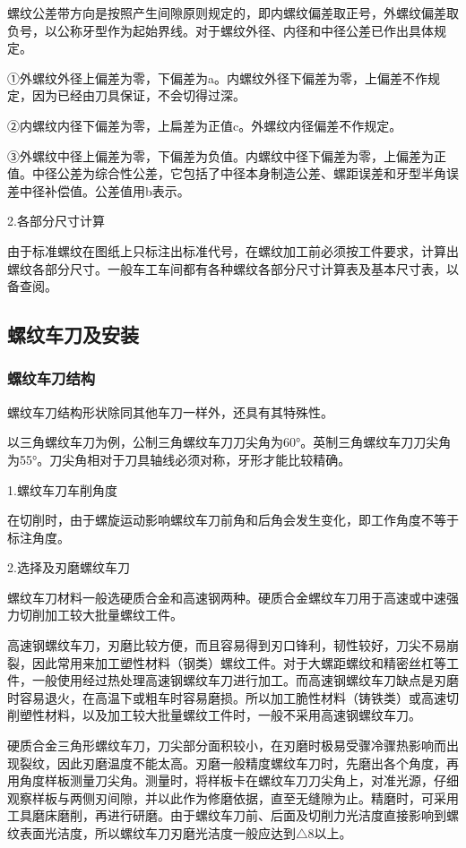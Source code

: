 \documentclass{ctexbook}
\begin{document}
螺纹公差带方向是按照产生间隙原则规定的，即内螺纹偏差取正号，外螺纹偏差取负号，以公称牙型作为起始界线。对于螺纹外径、内径和中径公差已作出具体规定。

①外螺纹外径上偏差为零，下偏差为a。内螺纹外径下偏差为零，上偏差不作规定，因为已经由刀具保证，不会切得过深。

②内螺纹内径下偏差为零，上扁差为正值c。外螺纹内径偏差不作规定。

③外螺纹中径上偏差为零，下偏差为负值。内螺纹中径下偏差为零，上偏差为正值。中径公差为综合性公差，它包括了中径本身制造公差、螺距误差和牙型半角误差中径补偿值。公差值用b表示。

2.各部分尺寸计算

由于标准螺纹在图纸上只标注出标准代号，在螺纹加工前必须按工件要求，计算出螺纹各部分尺寸。一般车工车间都有各种螺纹各部分尺寸计算表及基本尺寸表，以备查阅。
\subsection{螺纹车刀及安装}
\subsubsection{螺纹车刀结构}
螺纹车刀结构形状除同其他车刀一样外，还具有其特殊性。

以三角螺纹车刀为例，公制三角螺纹车刀刀尖角为60°。英制三角螺纹车刀刀尖角为55°。刀尖角相对于刀具轴线必须对称，牙形才能比较精确。

1.螺纹车刀车削角度

在切削时，由于螺旋运动影响螺纹车刀前角和后角会发生变化，即工作角度不等于标注角度。

2.选择及刃磨螺纹车刀

螺纹车刀材料一般选硬质合金和高速钢两种。硬质合金螺纹车刀用于高速或中速强力切削加工较大批量螺纹工件。

高速钢螺纹车刀，刃磨比较方便，而且容易得到刃口锋利，韧性较好，刀尖不易崩裂，因此常用来加工塑性材料（钢类）螺纹工件。对于大螺距螺纹和精密丝杠等工件，一般使用经过热处理高速钢螺纹车刀进行加工。而高速钢螺纹车刀缺点是刃磨时容易退火，在高温下或粗车时容易磨损。所以加工脆性材料（铸铁类）或高速切削塑性材料，以及加工较大批量螺纹工件时，一般不采用高速钢螺纹车刀。

硬质合金三角形螺纹车刀，刀尖部分面积较小，在刃磨时极易受骤冷骤热影响而出现裂纹，因此刃磨温度不能太高。刃磨一般精度螺纹车刀时，先磨出各个角度，再用角度样板测量刀尖角。测量时，将样板卡在螺纹车刀刀尖角上，对准光源，仔细观察样板与两侧刃间隙，并以此作为修磨依据，直至无缝隙为止。精磨时，可采用工具磨床磨削，再进行研磨。由于螺纹车刀前、后面及切削力光洁度直接影响到螺纹表面光洁度，所以螺纹车刀刃磨光洁度一般应达到$\bigtriangleup$8以上。
\end{document}
